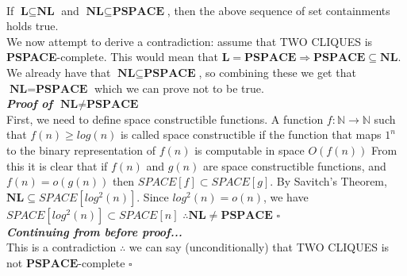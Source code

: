 \documentclass[12pt]{article}
\newcommand*{\field}[1]{\mathbb{#1}}
\begin{document}
\begin{enumerate}
\begin{enumerate}
\\
If $\textbf{L} \subseteq \textbf{NL}$ and $\textbf{NL} \subseteq \textbf{PSPACE}$, then the above sequence of set containments holds true.\\
We now attempt to derive a contradiction: assume that TWO CLIQUES is \textbf{PSPACE}-complete. This would mean that $\textbf{L} = \textbf{PSPACE} \Rightarrow \textbf{PSPACE} \subseteq \textbf{NL}$. We already have that $\textbf{NL} \subseteq \textbf{PSPACE}$, so combining these we get that $\textbf{NL} = \textbf{PSPACE} $ which we can prove not to be true.\\
\textit{\textbf{Proof of $\textbf{NL} \neq \textbf{PSPACE}$}}\\
First, we need to define space constructible functions. A function $f:\field{N} \rightarrow \field{N} $ such that $f(n) \geq log(n)$ is called space constructible if the function that maps $1^n$ to the binary representation of $f(n)$ is computable in space $O(f(n))$ From this it is clear that if $f(n)$ and $g(n)$ are space constructible functions, and $f(n)=o(g(n))$ then $SPACE[f] \subset SPACE[g]$. By Savitch's Theorem, $\textbf{NL} \subseteq SPACE[log^2(n)]$. Since $log^2(n) = o(n)$, we have $SPACE[log^2(n)] \subset SPACE[n]$ $\therefore \textbf{NL} \neq \textbf{PSPACE}$ $\square $  \\
\textit{\textbf{Continuing from before proof...}}\\
This is a contradiction $\therefore $ we can say (unconditionally) that TWO CLIQUES is not $\textbf{PSPACE}$-complete $\square $
\end{enumerate}

\end{enumerate}
\end{document}
